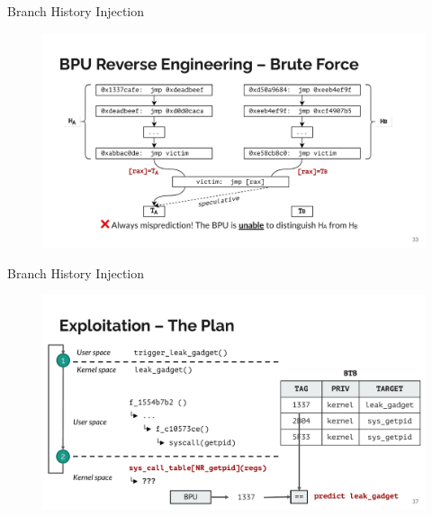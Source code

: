 \documentclass{beamer}
\begin{document}
\begin{frame}{Branch History Injection\cite{bhi}}
    \begin{figure}
        \begin{center}
            \includegraphics[width=1\textwidth]{img/bruteforce.pdf}
        \end{center}
    \end{figure} 
\end{frame}

\begin{frame}{Branch History Injection\cite{bhi}}
    \begin{figure}
        \begin{center}
            \includegraphics[width=1\textwidth]{img/exploit.pdf}
        \end{center}
    \end{figure}  
\end{frame}
\end{document}
